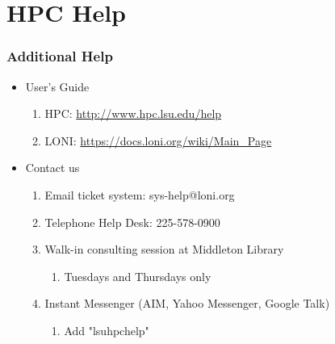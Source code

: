 \documentclass[slidestop,mathserif,compress,xcolor=svgnames,table]{beamer}
\newcommand*\vardiamond{\textcolor{tigerspurple}{%
  \ensuremath{\blacklozenge}}}
\begin{document}
\section{HPC Help}
\begin{frame}
\frametitle{\small Additional Help}
\begin{itemize}
\item User's Guide
\begin{enumerate}
\item[$\vardiamond$]HPC: \url{http://www.hpc.lsu.edu/help}
\item[$\vardiamond$]LONI: \url{https://docs.loni.org/wiki/Main_Page}
\end{enumerate}
\item Contact us
\begin{enumerate}
\item[$\vardiamond$]Email ticket system: sys-help@loni.org
\item[$\vardiamond$]Telephone Help Desk: 225-578-0900
\item[$\vardiamond$]Walk-in consulting session at Middleton Library
\begin{enumerate}
\item[$\bigstar$]Tuesdays and Thursdays only
\end{enumerate}
\item[$\vardiamond$]Instant Messenger (AIM, Yahoo Messenger, Google Talk)
\begin{enumerate}
\item[$\bigstar$]Add "lsuhpchelp"
\end{enumerate}
\end{enumerate}
\end{itemize}
\end{frame}
\end{document}
